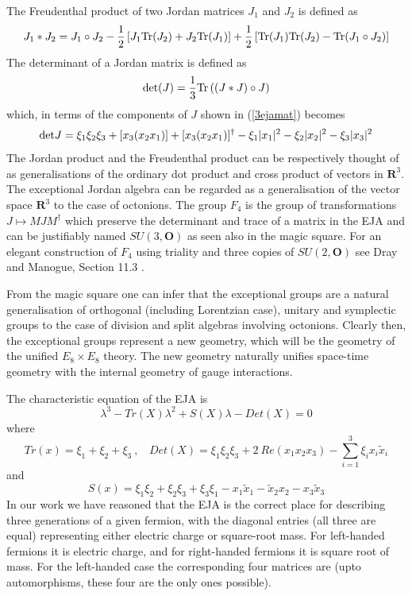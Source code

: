 \documentclass{iopconfser}
\begin{document}
The Freudenthal product of two Jordan matrices $J_1$ and $J_2$ is defined as
\begin{equation}
{J_1*J_2} = J_1\circ J_2 - \frac{1}{2} \left[ J_1{\rm Tr} (J_2) + J_2{\rm Tr} (J_1)\right] + \frac{1}{2}\left[{\rm Tr}(J_1){\rm Tr}(J_2) - {\rm Tr}(J_1\circ J_2) \right]
\end{equation}
The determinant of a Jordan matrix is defined as
\begin{equation}
{\rm det} (J) =\frac{1}{3}{\rm Tr} \left((J*J)\circ J\right)
\end{equation}
which, in terms of the components of $J$ shown in (\ref{3ejamat}) becomes
\begin{equation}
{\rm det} J = \xi_1\xi_2\xi_3 + [x_3(x_2 x_1)] + [x_3(x_2x_1)]^\dagger - \xi_1 |x_1|^2 - \xi_2 |x_2|^2 - \xi_3 |x_3|^2
\end{equation}
The Jordan product and the Freudenthal product can be respectively thought of as generalisations of the ordinary dot product and cross product of vectors in $\mathbf R^3$. The exceptional Jordan algebra can be regarded as a generalisation of the vector space $\mathbf R^3$ to the case of octonions. The group $F_4$ is the group of transformations $J\mapsto MJM^\dagger$ which preserve the determinant and trace of a matrix in the EJA and can be justifiably named $SU(3,\mathbf O)$ as seen also in the magic square. For an elegant construction of $F_4$ using triality and three copies of $SU(2, \mathbf O)$ see Dray and Manogue, Section 11.3 \cite{Dray}.

From the magic square one can infer that the exceptional groups are a natural generalisation of orthogonal (including Lorentzian case), unitary and symplectic groups to the case of division and split algebras involving octonions. Clearly then, the exceptional groups represent a new geometry, which will be the geometry of the unified $E_8 \times E_8$ theory. The new geometry naturally unifies space-time geometry with the internal geometry of gauge interactions.

The characteristic equation of the EJA is
\begin{equation}
\lambda^3-Tr(X)\lambda^2+S(X)\lambda-Det(X)=0
\end{equation}
where
\begin{equation}
Tr(x)=\xi_1+\xi_2+\xi_3\ ,\ \ \ \  Det(X)=\xi_1 \xi_2 \xi_3 +2\ Re(x_1 x_2 x_3)-\sum\limits_{i=1}^3 \xi_i x_i \tilde{x}_i
\end{equation}
and
\begin{equation}
S(x)=\xi_1 \xi_2+\xi_2 \xi_3+\xi_3 \xi_1-x_1\tilde{x}_1-\tilde{x}_2x_2-x_3\tilde{x}_3
\end{equation}
In our work we have reasoned that the EJA is the correct place for describing three generations of a given fermion, with the diagonal entries (all three are equal) representing either electric charge or square-root mass. For left-handed fermions it is electric charge, and for right-handed fermions it is square root of mass. For the left-handed case the corresponding four matrices are (upto automorphisms, these four are the only ones possible).
\end{document}
